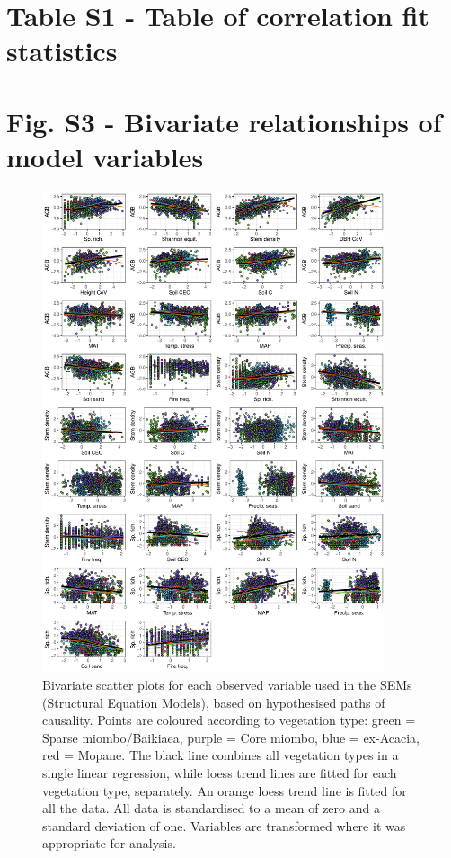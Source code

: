 \documentclass[11pt,a4paper]{article}
\begin{document}
\appendix{}
\section*{Table S1 - Table of correlation fit statistics} \label{appendixb}



\section*{Fig. S3 - Bivariate relationships of model variables} \label{appendixc}

\begin{figure}[H]
\centering
	\includegraphics[width=0.9\textwidth]{bivar_lm}
	\caption{Bivariate scatter plots for each observed variable used in the SEMs (Structural Equation Models), based on hypothesised paths of causality. Points are coloured according to vegetation type: green = Sparse miombo/Baikiaea, purple = Core miombo, blue = ex-Acacia, red = Mopane. The black line combines all vegetation types in a single linear regression, while loess trend lines are fitted for each vegetation type, separately. An orange loess trend line is fitted for all the data. All data is standardised to a mean of zero and a standard deviation of one. Variables are transformed where it was appropriate for analysis.}
	\label{bivar_lm}
\end{figure}
\end{document}
